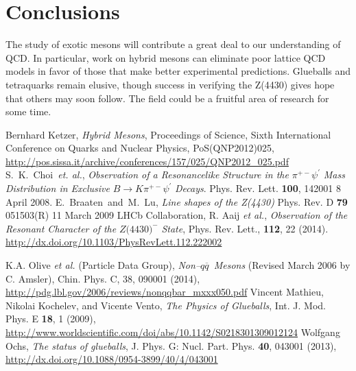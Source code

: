 \documentclass[aps,prd,twocolumn,nofootinbib]{revtex4-1}
\DeclareRobustCommand{\qqbar}{$q\overline{q}$}
\begin{document}

\section{Conclusions}
The study of exotic mesons will contribute a great deal to our understanding of QCD. In particular, work on hybrid mesons can eliminate poor lattice QCD models in favor of those that make better experimental predictions. Glueballs and tetraquarks remain elusive, though success in verifying the Z(4430) gives hope that others may soon follow. The field could be a fruitful area of research for some time.


\newpage

\begin{thebibliography}{9}
  Bernhard Ketzer, \textit{Hybrid Mesons}, Proceedings of Science, Sixth International Conference on Quarks and Nuclear Physics, PoS(QNP2012)025, \url{http://pos.sissa.it/archive/conferences/157/025/QNP2012_025.pdf} %
  S.~K.~Choi~\emph{et. al.}, \emph{Observation of a Resonancelike Structure in the} $\pi^{+-}\psi^{\prime}$ \emph{Mass Distribution in Exclusive} $B\rightarrow K \pi^{+-}\psi^{\prime}$ \emph{Decays}. Phys. Rev. Lett. \textbf{100}, 142001 8 April 2008.
  E.~Braaten~and~M.~Lu, \emph{Line shapes of the Z(4430)} Phys. Rev. D \textbf{79} 051503(R) 11 March 2009
  LHCb Collaboration, R. Aaij \textit{et al.}, \textit{Observation of the Resonant Character of the }$Z(4430{)}^{-}$\textit{ State}, Phys. Rev. Lett., \textbf{112}, 22 (2014). \url{http://dx.doi.org/10.1103/PhysRevLett.112.222002}%


 K.A. Olive \textit{et al.} (Particle Data Group), \textit{Non--\qqbar~Mesons} (Revised March 2006 by C. Amsler), Chin. Phys. C, 38, 090001 (2014), \url{http://pdg.lbl.gov/2006/reviews/nonqqbar_mxxx050.pdf}
 Vincent Mathieu, Nikolai Kochelev, and Vicente Vento, \emph{The Physics of Glueballs}, Int. J. Mod. Phys. E \textbf{18}, 1 (2009), \url{http://www.worldscientific.com/doi/abs/10.1142/S0218301309012124}
 Wolfgang Ochs, \emph{The status of glueballs}, J. Phys. G: Nucl. Part. Phys. \textbf{40}, 043001 (2013), \url{http://dx.doi.org/10.1088/0954-3899/40/4/043001}


\end{thebibliography}
\end{document}
